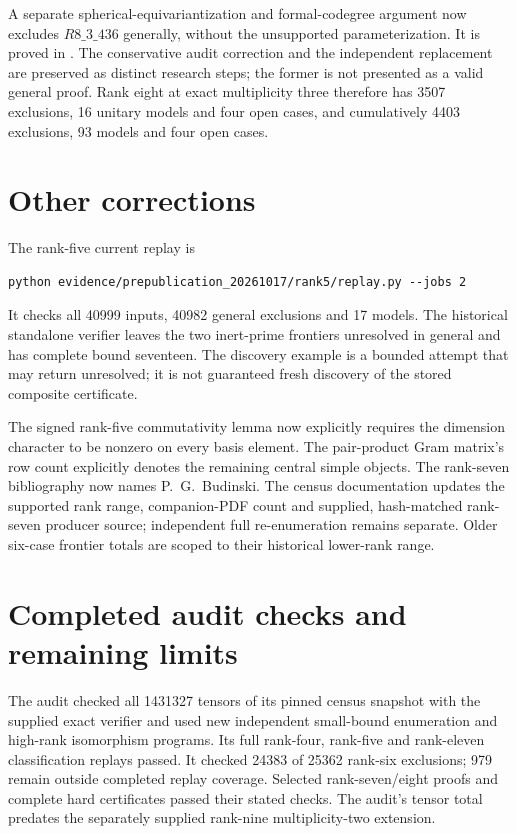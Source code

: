 \documentclass[11pt,a4paper]{article}
\begin{document}
A separate spherical-equivariantization and formal-codegree argument
now excludes $R8\_3\_436$ generally, without the unsupported
parameterization. It is proved in
. The conservative audit correction
and the independent replacement are preserved as distinct research
steps; the former is not presented as a valid general proof.
Rank eight at exact multiplicity three therefore has 3507 exclusions,
16 unitary models and four open cases, and cumulatively 4403 exclusions,
93 models and four open cases.

\section{Other corrections}
The rank-five current replay is
\begin{verbatim}
python evidence/prepublication_20261017/rank5/replay.py --jobs 2
\end{verbatim}
It checks all 40999 inputs, 40982 general exclusions and 17 models.
The historical standalone verifier leaves the two inert-prime frontiers
unresolved in general and has complete bound seventeen. The discovery example
is a bounded attempt that may return unresolved; it is not guaranteed fresh
discovery of the stored composite certificate.

The signed rank-five commutativity lemma now explicitly requires the dimension
character to be nonzero on every basis element. The pair-product Gram matrix's
row count explicitly denotes the remaining central simple objects. The
rank-seven bibliography now names P.~G.~Budinski. The census documentation
updates the supported rank range, companion-PDF count and supplied, hash-matched
rank-seven producer source; independent full re-enumeration remains separate.
Older six-case frontier totals are scoped to their historical lower-rank range.

\section{Completed audit checks and remaining limits}
The audit checked all 1431327 tensors of its pinned census snapshot with the
supplied exact verifier and used new independent small-bound enumeration and
high-rank isomorphism programs. Its full rank-four, rank-five and rank-eleven
classification replays passed. It checked 24383 of 25362 rank-six exclusions;
979 remain outside completed replay coverage. Selected rank-seven/eight proofs
and complete hard certificates passed their stated checks. The audit's tensor
total predates the separately supplied rank-nine multiplicity-two extension.
\end{document}
